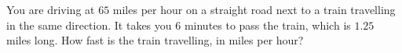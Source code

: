You are driving at $65$ miles per hour on a straight road next to a train travelling in the same direction. It takes you $6$ minutes to pass the train, which is $1.25$ miles long. How fast is the train travelling, in miles per hour?
